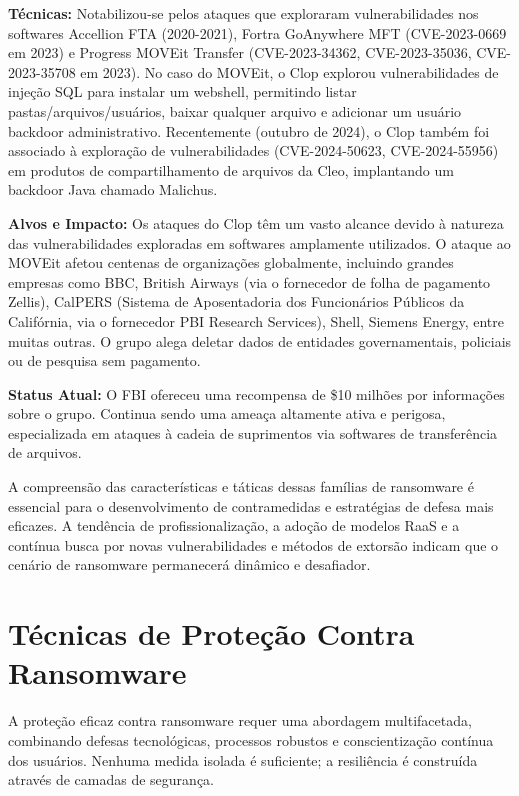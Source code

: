 \textbf{Técnicas:} Notabilizou-se pelos ataques que exploraram vulnerabilidades nos softwares Accellion FTA (2020-2021), Fortra GoAnywhere MFT (CVE-2023-0669 em 2023) e Progress MOVEit Transfer (CVE-2023-34362, CVE-2023-35036, CVE-2023-35708 em 2023). No caso do MOVEit, o Clop explorou vulnerabilidades de injeção SQL para instalar um webshell, permitindo listar pastas/arquivos/usuários, baixar qualquer arquivo e adicionar um usuário backdoor administrativo. Recentemente (outubro de 2024), o Clop também foi associado à exploração de vulnerabilidades (CVE-2024-50623, CVE-2024-55956) em produtos de compartilhamento de arquivos da Cleo, implantando um backdoor Java chamado Malichus.

\textbf{Alvos e Impacto:} Os ataques do Clop têm um vasto alcance devido à natureza das vulnerabilidades exploradas em softwares amplamente utilizados. O ataque ao MOVEit afetou centenas de organizações globalmente, incluindo grandes empresas como BBC, British Airways (via o fornecedor de folha de pagamento Zellis), CalPERS (Sistema de Aposentadoria dos Funcionários Públicos da Califórnia, via o fornecedor PBI Research Services), Shell, Siemens Energy, entre muitas outras. O grupo alega deletar dados de entidades governamentais, policiais ou de pesquisa sem pagamento.

\textbf{Status Atual:} O FBI ofereceu uma recompensa de \$10 milhões por informações sobre o grupo. Continua sendo uma ameaça altamente ativa e perigosa, especializada em ataques à cadeia de suprimentos via softwares de transferência de arquivos.

A compreensão das características e táticas dessas famílias de ransomware é essencial para o desenvolvimento de contramedidas e estratégias de defesa mais eficazes. A tendência de profissionalização, a adoção de modelos RaaS e a contínua busca por novas vulnerabilidades e métodos de extorsão indicam que o cenário de ransomware permanecerá dinâmico e desafiador.

\section{Técnicas de Proteção Contra Ransomware}
A proteção eficaz contra ransomware requer uma abordagem multifacetada, combinando defesas tecnológicas, processos robustos e conscientização contínua dos usuários. Nenhuma medida isolada é suficiente; a resiliência é construída através de camadas de segurança.

